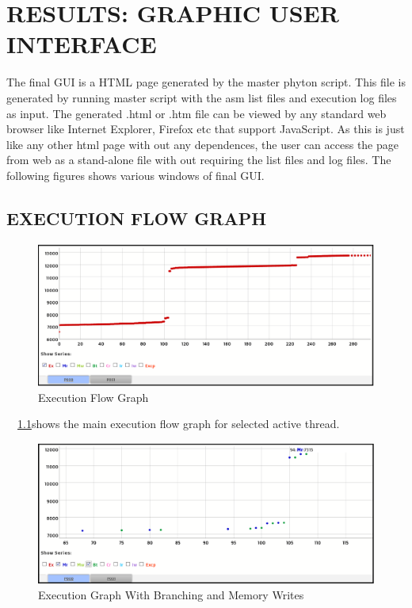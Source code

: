 \chapter{RESULTS: GRAPHIC USER INTERFACE}
\label{chap:GUI_results.tex}
The final GUI is a HTML page generated by the master phyton script. This file is generated by running master script with the asm list files and execution log files as input. The generated .html or .htm file can be viewed by any standard web browser like Internet Explorer, Firefox etc that support JavaScript. As this is just like any other html page with out any dependences, the user can access the page from web as a stand-alone file with out requiring the list files and log files. 
The following figures shows various windows of final GUI.
\section {EXECUTION FLOW GRAPH}
\begin{figure}[H]
\centering
\includegraphics[width=6in]{./figures/gui_graph1.eps}
\caption{Execution Flow Graph}
\label{fig:gui_graph1.eps}
\end{figure}

~\figurename{~\ref{fig:gui_graph1.eps}}shows the main execution flow graph for selected active thread.  
\begin{figure}[H]
\centering
\includegraphics[width=6in]{./figures/gui_graph2.eps}
\caption{Execution Graph With Branching and Memory Writes}
\label{fig:gui_graph2.eps}
\end{figure}

